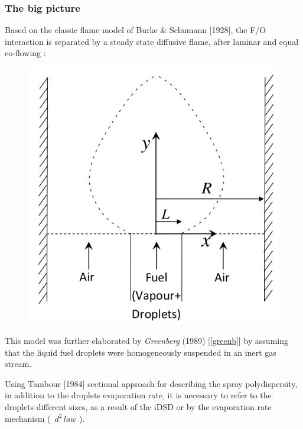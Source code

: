 \documentclass[12pt]{article}
\numberwithin{equation}{section}
\begin{document}
\begin{flushleft}
\subsubsection*{The big picture}

Based on the classic flame model of Burke \& Schumann [1928], the F/O interaction is separated by a steady state diffusive flame, after laminar and equal co-flowing :

\begin{figure}[H]
\centering
\includegraphics[scale=0.425]{model_schema.png}
\end{figure}

This model was further elaborated by \textit{Greenberg} (1989) [\ref{greenb}] by assuming that the liquid fuel droplets were homogeneously suspended in an inert gas stream.

Using Tambour [1984] sectional approach for describing the spray polydispersity, in addition to the droplets evaporation rate, it is necessary to refer to the droplets different sizes, as a result of the iDSD or by the evaporation rate mechanism ( \,$d^2 \, law$ ).

\newpage


\end{flushleft}
\end{document}
